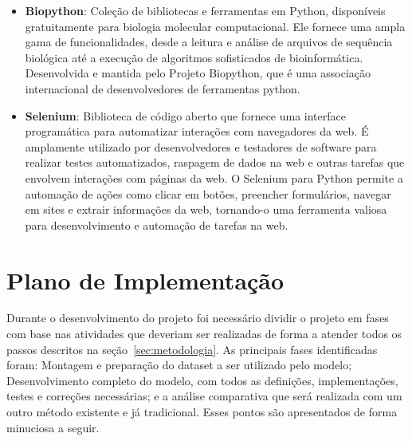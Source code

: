 \begin{itemize}
  \item \textbf{Biopython}: Coleção de bibliotecas e ferramentas em Python, disponíveis gratuitamente para biologia molecular computacional. Ele fornece uma ampla gama de funcionalidades, desde a leitura e análise de arquivos de sequência biológica até a execução de algoritmos sofisticados de bioinformática. Desenvolvida e mantida pelo Projeto Biopython, que é uma associação internacional de desenvolvedores de ferramentas python.~\cite{biopython}
  \item \textbf{Selenium}: Biblioteca de código aberto que fornece uma interface programática para automatizar interações com navegadores da web. É amplamente utilizado por desenvolvedores e testadores de software para realizar testes automatizados, raspagem de dados na web e outras tarefas que envolvem interações com páginas da web. O Selenium para Python permite a automação de ações como clicar em botões, preencher formulários, navegar em sites e extrair informações da web, tornando-o uma ferramenta valiosa para desenvolvimento e automação de tarefas na web.~\cite{selenium-python}
\end{itemize}



\section{Plano de Implementação}

Durante o desenvolvimento do projeto foi necessário dividir o projeto em fases com base nas atividades que deveriam ser realizadas de forma a atender todos os passos descritos na seção~\ref{sec:metodologia}. As principais fases identificadas foram: Montagem e preparação do dataset a ser utilizado pelo modelo; Desenvolvimento completo do modelo, com todos as definições, implementações, testes e correções necessárias; e a análise comparativa que será realizada com um outro método existente e já tradicional. Esses pontos são apresentados de forma minuciosa a seguir.

